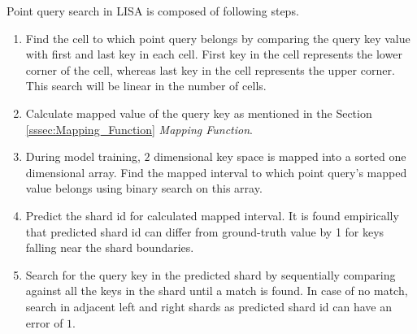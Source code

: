 Point query search in LISA is composed of following steps.

\begin{enumerate}
	\item Find the cell to which point query belongs by comparing the query key value with first and last key in each cell. First key in the cell represents the lower corner of the cell, whereas last key in the cell represents the upper corner. This search will be linear in the number of cells.
	\item Calculate mapped value of the query key as mentioned in the Section \ref{sssec:Mapping_Function} \textit{Mapping Function}.
	\item During model training, $2$ dimensional key space is mapped into a sorted one dimensional array. Find the mapped interval to which point query's mapped value belongs using binary search on this array.  
	\item Predict the shard id for calculated mapped interval. It is found empirically that predicted shard id can differ from ground-truth value by 1 for keys falling near the shard boundaries. 
	\item Search for the query key in the predicted shard by sequentially comparing against all the keys in the shard until a match is found. In case of no match, search in adjacent left and right shards as predicted shard id can have an error of $1$. 
\end{enumerate}